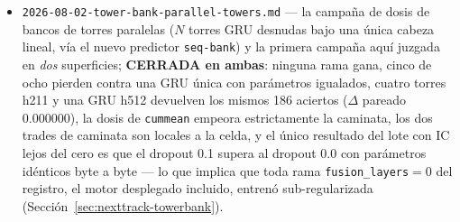 \documentclass[11pt]{article}
\begin{document}
\begin{itemize}
    estándar: las cinco ramas de 4 etapas caen \emph{por debajo} del umbral de
    recall y quedan refutadas otra vez en la caminata, el control de capacidad de
    $\num{3.24}\times$ empata en ambas, la hipótesis del usuario sobre la posición
    del rectificador queda refutada, enmarcar supera a intercalar a capacidad
    idéntica bit a bit, y la rama de mejor ajuste del lote recupera \num{55}
    aciertos menos que el control (Sección~\ref{sec:nexttrack-stagestack}).
  \item \texttt{2026-08-02-tower-bank-parallel-towers.md} --- la campaña de dosis
    de bancos de torres paralelas ($N$ torres GRU desnudas bajo una única cabeza
    lineal, vía el nuevo predictor \texttt{seq-bank}) y la primera campaña aquí
    juzgada en \emph{dos} superficies; \textbf{CERRADA en ambas}: ninguna rama
    gana, cinco de ocho pierden contra una GRU única con parámetros igualados,
    cuatro torres h211 y una GRU h512 devuelven los mismos \num{186} aciertos
    ($\Delta$ pareado \num{0.000000}), la dosis de \texttt{cummean} empeora
    estrictamente la caminata, los dos trades de caminata son locales a la celda, y
    el único resultado del lote con IC lejos del cero es que el dropout \num{0.1}
    supera al dropout \num{0.0} con parámetros idénticos byte a byte --- lo que
    implica que toda rama \texttt{fusion\_layers}${}=0$ del registro, el motor
    desplegado incluido, entrenó sub-regularizada
    (Sección~\ref{sec:nexttrack-towerbank}).
\end{itemize}
\end{document}
